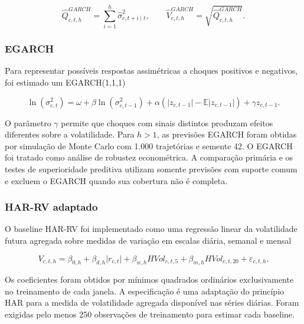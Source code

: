 \documentclass[a4paper,fleqn]{cas-sc}
\begin{document}
\begin{equation}
\widehat{Q}^{GARCH}_{c,t,h}
=
\sum_{i=1}^{h}\widehat{\sigma}_{c,t+i\mid t}^{2},
\qquad
\widehat{V}^{GARCH}_{c,t,h}
=
\sqrt{\widehat{Q}^{GARCH}_{c,t,h}}.
\label{eq:garch_forecast}
\end{equation}

\subsubsection{EGARCH}

Para representar possíveis respostas assimétricas a choques positivos e negativos, foi estimado um EGARCH(1,1,1) \citep{Nelson1991EGARCH}

\begin{equation}
\ln\left(\sigma_{c,t}^{2}\right)
=
\omega
+\beta\ln\left(\sigma_{c,t-1}^{2}\right)
+\alpha\left(\lvert z_{c,t-1}\rvert-\mathbb{E}\lvert z_{c,t-1}\rvert\right)
+\gamma z_{c,t-1}.
\label{eq:egarch}
\end{equation}

O parâmetro \(\gamma\) permite que choques com sinais distintos produzam efeitos diferentes sobre a volatilidade. Para \(h>1\), as previsões EGARCH foram obtidas por simulação de Monte Carlo com 1.000 trajetórias e semente 42. O EGARCH foi tratado como análise de robustez econométrica. A comparação primária e os testes de superioridade preditiva utilizam somente previsões com suporte comum e excluem o EGARCH quando sua cobertura não é completa.

\subsubsection{HAR-RV adaptado}

O baseline HAR-RV foi implementado como uma regressão linear da volatilidade futura agregada sobre medidas de variação em escalas diária, semanal e mensal \citep{Corsi2009HAR}

\begin{equation}
V_{c,t,h}
=
\beta_{0,h}
+\beta_{d,h}\lvert r_{c,t}\rvert
+\beta_{w,h}HVol_{c,t,5}
+\beta_{m,h}HVol_{c,t,20}
+\varepsilon_{c,t,h}.
\label{eq:har}
\end{equation}

Os coeficientes foram obtidos por mínimos quadrados ordinários exclusivamente no treinamento de cada janela. A especificação é uma adaptação do princípio HAR para a medida de volatilidade agregada disponível nas séries diárias. Foram exigidas pelo menos 250 observações de treinamento para estimar cada baseline.
\end{document}
